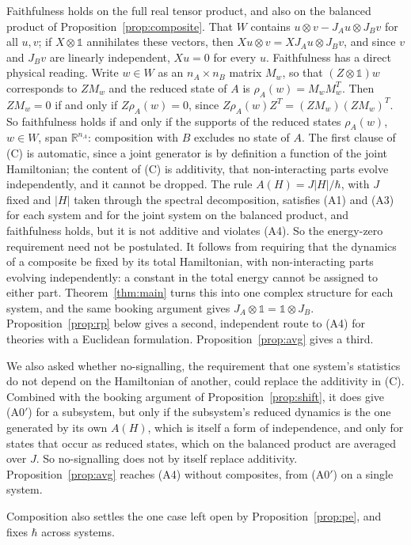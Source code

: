 \documentclass[11pt]{article}
\theoremstyle{remark}
\newcommand{\R}{\mathbb{R}}
\newcommand{\one}{\mathbb{1}}
\begin{document}
Faithfulness holds on the full real tensor product, and also on the balanced product of Proposition~\ref{prop:composite}. That $W$ contains $u\otimes v-J_Au\otimes J_Bv$ for all $u,v$; if $X\otimes\one$ annihilates these vectors, then $Xu\otimes v=XJ_Au\otimes J_Bv$, and since $v$ and $J_Bv$ are linearly independent, $Xu=0$ for every $u$. Faithfulness has a direct physical reading. Write $w\in W$ as an $n_A\times n_B$ matrix $M_w$, so that $(Z\otimes\one)w$ corresponds to $ZM_w$ and the reduced state of $A$ is $\rho_A(w)=M_wM_w^T$. Then $ZM_w=0$ if and only if $Z\rho_A(w)=0$, since $Z\rho_A(w)Z^T=(ZM_w)(ZM_w)^T$. So faithfulness holds if and only if the supports of the reduced states $\rho_A(w)$, $w\in W$, span $\R^{n_A}$: composition with $B$ excludes no state of $A$. The first clause of (C) is automatic, since a joint generator is by definition a function of the joint Hamiltonian; the content of (C) is additivity, that non-interacting parts evolve independently, and it cannot be dropped. The rule $A(H)=J|H|/\hbar$, with $J$ fixed and $|H|$ taken through the spectral decomposition, satisfies (A1) and (A3) for each system and for the joint system on the balanced product, and faithfulness holds, but it is not additive and violates (A4). So the energy-zero requirement need not be postulated. It follows from requiring that the dynamics of a composite be fixed by its total Hamiltonian, with non-interacting parts evolving independently: a constant in the total energy cannot be assigned to either part. Theorem~\ref{thm:main} turns this into one complex structure for each system, and the same booking argument gives $J_A\otimes\one=\one\otimes J_B$. Proposition~\ref{prop:rp} below gives a second, independent route to (A4) for theories with a Euclidean formulation. Proposition~\ref{prop:avg} gives a third.

We also asked whether no-signalling, the requirement that one system's statistics do not depend on the Hamiltonian of another, could replace the additivity in (C). Combined with the booking argument of Proposition~\ref{prop:shift}, it does give (A0$'$) for a subsystem, but only if the subsystem's reduced dynamics is the one generated by its own $A(H)$, which is itself a form of independence, and only for states that occur as reduced states, which on the balanced product are averaged over $J$. So no-signalling does not by itself replace additivity. Proposition~\ref{prop:avg} reaches (A4) without composites, from (A0$'$) on a single system.

Composition also settles the one case left open by Proposition~\ref{prop:pe}, and fixes $\hbar$ across systems.
\end{document}
